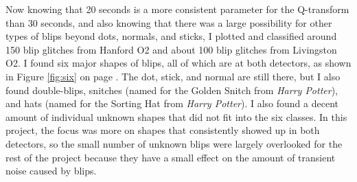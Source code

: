 \documentclass[a4paper]{article}
\begin{document}
Now knowing that 20 seconds is a more consistent parameter for the Q-transform than 30 seconds, and also knowing that there was a large possibility for other types of blips beyond dots, normals, and sticks, I plotted and classified around 150 blip glitches from Hanford O2 and about 100 blip glitches from Livingston O2. I found six major shapes of blips, all of which are at both detectors, as shown in Figure \ref{fig:six} on page \pageref{fig:six}. The dot, stick, and normal are still there, but I also found double-blips, snitches (named for the Golden Snitch from \textit{Harry Potter}), and hats (named for the Sorting Hat from \textit{Harry Potter}). I also found a decent amount of individual unknown shapes that did not fit into the six classes. In this project, the focus was more on shapes that consistently showed up in both detectors, so the small number of unknown blips were largely overlooked for the rest of the project because they have a small effect on the amount of transient noise caused by blips.
\end{document}
